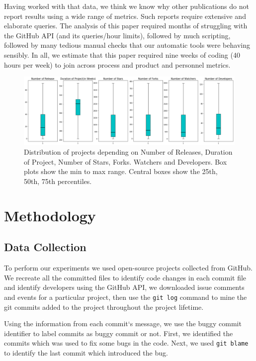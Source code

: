 \documentclass[sigconf,review]{acmart}
\begin{document}
Having worked with that data, we think we know why other publications do not report results using a wide range of metrics. Such reports
require extensive and elaborate queries.
 The analysis of this paper required
months of struggling with the GitHub API (and its queries/hour limits), followed by much   scripting, followed by many tedious manual checks that our automatic tools were behaving sensibly. In all, we estimate that this paper required nine weeks of coding (40 hours per week) to join across
process and product and personnel metrics.




\begin{figure}[!t]
\includegraphics[width=\linewidth]{meta_final3.png}
\caption{Distribution of projects depending on Number of Releases, Duration of Project, Number of Stars, Forks. Watchers and Developers.  Box plots show the min to max range. Central boxes show the 25th, 50th, 75th percentiles.}
\label{fig:data}
\end{figure}



\section{Methodology}
\label{sec:Methodology}

\subsection{Data Collection}
\label{sec:Data Collections}
To perform our experiments we used open-source projects collected from GitHub. 
 We recreate all the committed files to identify code changes in each commit file and identify developers 
using the   GitHub API, we  downloaded issue comments and events for a particular project, then use the {\tt git log}
command to mine the git commits added to the project throughout the project lifetime. 

Using the information from each commit`s message, we use the buggy commit identifier to label commits as buggy commit or not. First, we  identified the commits which was used to fix some bugs in the code.
Next, we used {\tt git blame} to identify the last commit which introduced the bug. 
\end{document}
